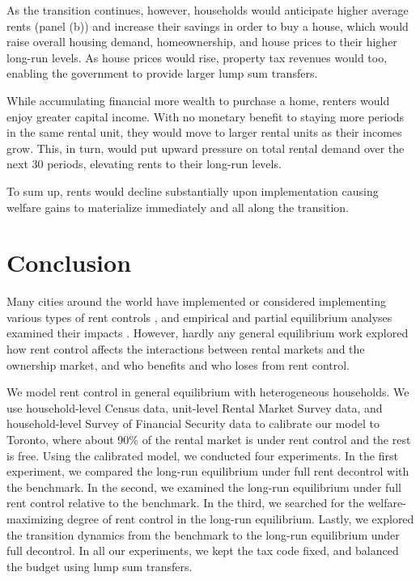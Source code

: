 \documentclass[parskip=full]{article}
\begin{document}
As the transition continues, however, households would anticipate higher average rents (panel (b)) and increase their savings in order to buy a house, which would raise overall housing demand, homeownership, and house prices to their higher long-run levels. As house prices would rise, property tax revenues would too, enabling the government to provide larger lump sum transfers.

While accumulating financial more wealth to purchase a home, renters would enjoy greater capital income. With no monetary benefit to staying more periods in the same rental unit, they would move to larger rental units as their incomes grow. This, in turn, would put upward pressure on total rental demand over the next 30 periods, elevating rents to their long-run levels.

To sum up, rents would decline substantially upon implementation causing welfare gains to materialize immediately and all along the transition. 

\section{Conclusion}\label{sec:conclusion}

Many cities around the world have implemented or considered implementing various types of rent controls \citep{fraser-1981}, and empirical and partial equilibrium analyses examined their impacts \citep{hayek-1929,fs-1946,fallis-1985,diamond-2019}. However, hardly any general equilibrium work explored how rent control affects the interactions between rental markets and the ownership market, and who benefits and who loses from rent control. 

We model rent control in general equilibrium with heterogeneous households. We use household-level Census data, unit-level Rental Market Survey data, and household-level Survey of Financial Security data to calibrate our model to Toronto, where about 90\% of the rental market is under rent control and the rest is free. Using the calibrated model, we conducted four experiments. In the first experiment, we compared the long-run equilibrium under full rent decontrol with the benchmark. In the second, we examined the long-run equilibrium under full rent control relative to the benchmark. In the third, we searched for the welfare-maximizing degree of rent control in the long-run equilibrium. Lastly, we explored the transition dynamics from the benchmark to the long-run equilibrium under full decontrol. In all our experiments, we kept the tax code fixed, and balanced the budget using lump sum transfers.
\end{document}
